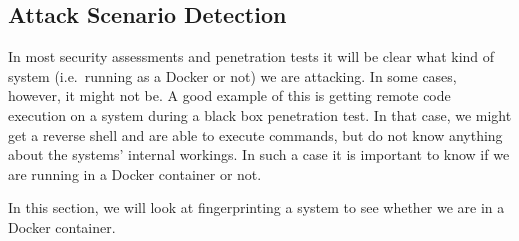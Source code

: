 \subsection{Attack Scenario Detection}
In most security assessments and penetration tests it will be clear what kind of system (i.e.\ running as a Docker or not) we are attacking. In some cases, however, it might not be. A good example of this is getting remote code execution on a system during a black box penetration test. In that case, we might get a reverse shell and are able to execute commands, but do not know anything about the systems' internal workings. In such a case it is important to know if we are running in a Docker container or not.

In this section, we will look at fingerprinting a system to see whether we are in a Docker container.





